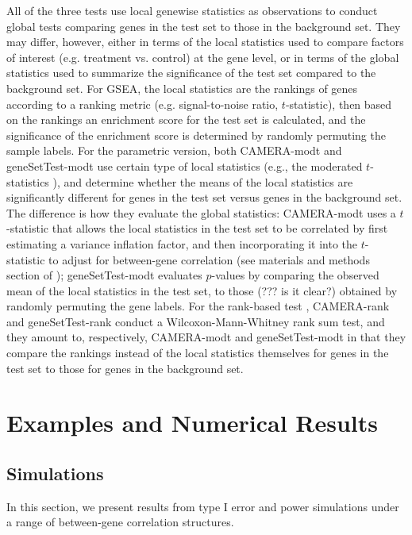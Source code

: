 \documentclass[11pt, a4paper]{article}
\begin{document}
	All of the three tests use local genewise statistics as observations to conduct global tests comparing genes in the test set to those in the background set. They may differ, however, either in terms of the local statistics used to compare factors of interest (e.g. treatment vs. control) at the gene level, or in terms of the global statistics used to summarize the significance of the test set compared to the background set. For GSEA, the local statistics are the rankings of genes according to a ranking metric (e.g. signal-to-noise ratio, $t$-statistic), then based on the rankings an enrichment score for the test set is calculated, and the significance of the enrichment score is determined by randomly permuting the sample labels. For the parametric version, both CAMERA-modt and geneSetTest-modt use certain type of local statistics (e.g., the moderated $t$-statistics \cite{Smyth2004moderated}), and determine whether the means of the local statistics are significantly different for genes in the test set versus genes in the background set. The difference is how they evaluate the global statistics: CAMERA-modt uses a $t$-statistic   that allows the local statistics in the test set to be correlated by first estimating a variance inflation factor, and then incorporating it into the $t$-statistic to adjust for between-gene correlation (see materials and methods section of \cite{wu2012camera}); geneSetTest-modt evaluates $p$-values by comparing the observed mean of the local statistics in the test set, to those (??? is it clear?) obtained by randomly permuting the gene labels. For the rank-based test , CAMERA-rank and geneSetTest-rank conduct a Wilcoxon-Mann-Whitney rank sum test, and they amount to, respectively,  CAMERA-modt and geneSetTest-modt in that they compare the rankings instead of the local statistics themselves for genes in the test set to those for genes in the background set. 
	

	
	\section{Examples and Numerical Results}\label{section:results}

	\subsection{Simulations}\label{subsection:simulation}
		In this section, we present results from type I error and power simulations under a range of between-gene correlation structures.
		
\end{document}
